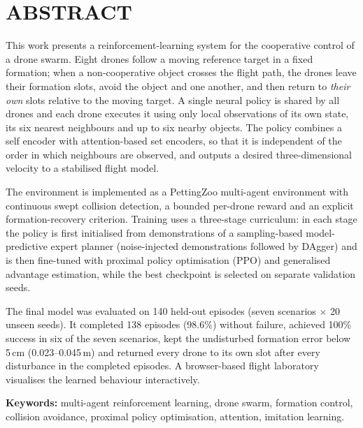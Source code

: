 \chapter*{ABSTRACT}
This work presents a reinforcement-learning system for the cooperative control of a drone swarm. Eight drones
follow a moving reference target in a fixed formation; when a non-cooperative object crosses the flight path,
the drones leave their formation slots, avoid the object and one another, and then return to \emph{their own}
slots relative to the moving target. A single neural policy is shared by all drones and each drone executes it
using only local observations of its own state, its six nearest neighbours and up to six nearby objects. The
policy combines a self encoder with attention-based set encoders, so that it is independent of the order in
which neighbours are observed, and outputs a desired three-dimensional velocity to a stabilised flight model.

The environment is implemented as a PettingZoo multi-agent environment with continuous swept collision
detection, a bounded per-drone reward and an explicit formation-recovery criterion. Training uses a three-stage
curriculum: in each stage the policy is first initialised from demonstrations of a sampling-based
model-predictive expert planner (noise-injected demonstrations followed by DAgger) and is then fine-tuned with
proximal policy optimisation (PPO) and generalised advantage estimation, while the best checkpoint is selected on
separate validation seeds.

The final model was evaluated on 140 held-out episodes (seven scenarios $\times$ 20 unseen seeds). It completed
138 episodes (98.6\%) without failure, achieved 100\% success in six of the seven scenarios, kept the
undisturbed formation error below 5\,cm (0.023--0.045\,m) and returned every drone to its own slot after every
disturbance in the completed episodes. A browser-based flight laboratory visualises the learned behaviour
interactively.

\vspace{0.5cm}
\noindent\textbf{Keywords:} multi-agent reinforcement learning, drone swarm, formation control, collision
avoidance, proximal policy optimisation, attention, imitation learning.

\clearpage
{\small{}\tableofcontents}
\ifwithlists
\clearpage
{}
{}
{\listoffigures}
\clearpage
{}
{}
{\listoftables}
\fi
